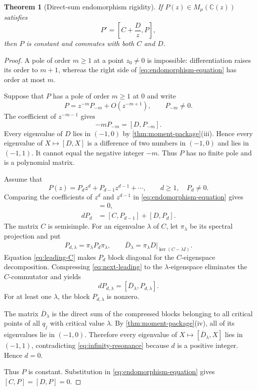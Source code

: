 \documentclass[11pt]{article}
\numberwithin{equation}{section}
\newtheorem{theorem}{Theorem}[section]
\theoremstyle{definition}
\theoremstyle{remark}
\newcommand{\C}{\mathbb C}
\begin{document}
\begin{theorem}[Direct-sum endomorphism rigidity]
\label{thm:direct-sum-rigidity}
If $P(z)\in M_\mu(\C(z))$ satisfies
\begin{equation}\label{eq:endomorphism-equation}
  P'=\left[C+\frac Dz,P\right],
\end{equation}
then $P$ is constant and commutes with both $C$ and $D$.
\end{theorem}

\begin{proof}
A pole of order $m\ge1$ at a point $z_0\ne0$ is impossible: differentiation
raises its order to $m+1$, whereas the right side of
\eqref{eq:endomorphism-equation} has order at most $m$.

Suppose that $P$ has a pole of order $m\ge1$ at $0$ and write
\[
  P=z^{-m}P_{-m}+O(z^{-m+1}),
  \qquad P_{-m}\ne0.
\]
The coefficient of $z^{-m-1}$ gives
\begin{equation}\label{eq:zero-resonance}
  -mP_{-m}=[D,P_{-m}].
\end{equation}
Every eigenvalue of $D$ lies in $(-1,0)$ by
\cref{thm:moment-package}(iii).  Hence every eigenvalue of
$X\mapsto[D,X]$ is a difference of two numbers in $(-1,0)$ and lies in
$(-1,1)$.  It cannot equal the negative integer $-m$.  Thus $P$ has no
finite pole and is a polynomial matrix.

Assume that
\[
  P(z)=P_dz^d+P_{d-1}z^{d-1}+\cdots,
  \qquad d\ge1,
  \quad P_d\ne0.
\]
Comparing the coefficients of $z^d$ and $z^{d-1}$ in
\eqref{eq:endomorphism-equation} gives
\begin{align}
  [C,P_d]&=0,\label{eq:leading-C}\\
  dP_d&=[C,P_{d-1}]+[D,P_d].\label{eq:next-leading}
\end{align}
The matrix $C$ is semisimple.  For an eigenvalue $\lambda$ of $C$, let
$\pi_\lambda$ be its spectral projection and put
\[
  P_{d,\lambda}=\pi_\lambda P_d\pi_\lambda,
  \qquad
  \overline D_\lambda
  =\pi_\lambda D|_{\ker(C-\lambda I)}.
\]
Equation \eqref{eq:leading-C} makes $P_d$ block diagonal for the
$C$-eigenspace decomposition.  Compressing \eqref{eq:next-leading} to the
$\lambda$-eigenspace eliminates the $C$-commutator and yields
\begin{equation}\label{eq:infinity-resonance}
  dP_{d,\lambda}
  =[\overline D_\lambda,P_{d,\lambda}].
\end{equation}
For at least one $\lambda$, the block $P_{d,\lambda}$ is nonzero.

The matrix $\overline D_\lambda$ is the direct sum of the compressed blocks
belonging to all critical points of all $q_j$ with critical value
$\lambda$.  By \cref{thm:moment-package}(iv), all of its eigenvalues lie in
$(-1,0)$.  Therefore every eigenvalue of
$X\mapsto[\overline D_\lambda,X]$ lies in $(-1,1)$, contradicting
\eqref{eq:infinity-resonance} because $d$ is a positive integer.  Hence
$d=0$.

Thus $P$ is constant.  Substitution in
\eqref{eq:endomorphism-equation} gives $[C,P]=[D,P]=0$.
\end{proof}
\end{document}
